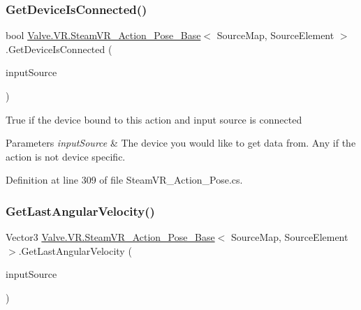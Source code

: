 \subsubsection{\texorpdfstring{GetDeviceIsConnected()}{GetDeviceIsConnected()}}
{\footnotesize\ttfamily bool \mbox{\hyperlink{class_valve_1_1_v_r_1_1_steam_v_r___action___pose___base}{Valve.\+V\+R.\+Steam\+V\+R\+\_\+\+Action\+\_\+\+Pose\+\_\+\+Base}}$<$ Source\+Map, Source\+Element $>$.Get\+Device\+Is\+Connected (\begin{DoxyParamCaption}\item[{\mbox{\hyperlink{namespace_valve_1_1_v_r_a82e5bf501cc3aa155444ee3f0662853f}{Steam\+V\+R\+\_\+\+Input\+\_\+\+Sources}}}]{input\+Source }\end{DoxyParamCaption})}



True if the device bound to this action and input source is connected 


\begin{DoxyParams}{Parameters}
{\em input\+Source} & The device you would like to get data from. Any if the action is not device specific.\\
\hline
\end{DoxyParams}


Definition at line 309 of file Steam\+V\+R\+\_\+\+Action\+\_\+\+Pose.\+cs.

\mbox{\label{class_valve_1_1_v_r_1_1_steam_v_r___action___pose___base_a1c0012123202777151db1e7364ca7abe}} 
\subsubsection{\texorpdfstring{GetLastAngularVelocity()}{GetLastAngularVelocity()}}
{\footnotesize\ttfamily Vector3 \mbox{\hyperlink{class_valve_1_1_v_r_1_1_steam_v_r___action___pose___base}{Valve.\+V\+R.\+Steam\+V\+R\+\_\+\+Action\+\_\+\+Pose\+\_\+\+Base}}$<$ Source\+Map, Source\+Element $>$.Get\+Last\+Angular\+Velocity (\begin{DoxyParamCaption}\item[{\mbox{\hyperlink{namespace_valve_1_1_v_r_a82e5bf501cc3aa155444ee3f0662853f}{Steam\+V\+R\+\_\+\+Input\+\_\+\+Sources}}}]{input\+Source }\end{DoxyParamCaption})}



